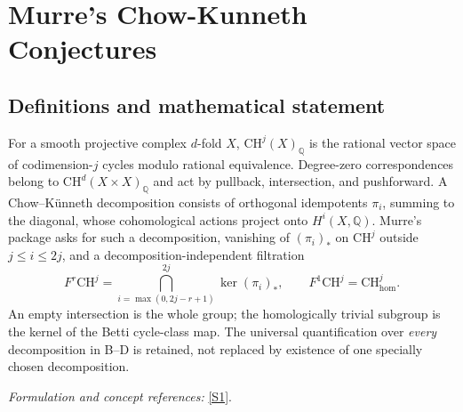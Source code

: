 \documentclass[11pt]{article}
\newcommand{\Q}{\mathbb{Q}}
\newcommand{\sref}[2]{\hyperlink{source:#1:#2}{[S#2]}}
\newif\ifshowcatalogue
\newcommand{\cataloguescope}[1]{\ifshowcatalogue
 \paragraph{Exact scope in the supplied catalogue.}
 \begin{quote}\small #1\end{quote}\fi}
\begin{document}
\setcounter{section}{0}
\clearpage
\section*{\texorpdfstring{Murre's Chow-Kunneth Conjectures}{Murre's Chow-Kunneth Conjectures}}\label{30006755}
\subsection{Definitions and mathematical statement}
For a smooth projective complex $d$-fold $X$, $\mathrm{CH}^j(X)_{\Q}$ is the rational vector space of codimension-$j$ cycles modulo rational equivalence. Degree-zero correspondences belong to $\mathrm{CH}^d(X\times X)_{\Q}$ and act by pullback, intersection, and pushforward. A Chow--K\"unneth decomposition consists of orthogonal idempotents $\pi_i$, summing to the diagonal, whose cohomological actions project onto $H^i(X,\Q)$. Murre's package asks for such a decomposition, vanishing of $(\pi_i)_*$ on $\mathrm{CH}^j$ outside $j\le i\le2j$, and a decomposition-independent filtration
\[
 F^r\mathrm{CH}^j=\bigcap_{i=\max(0,2j-r+1)}^{2j}\ker(\pi_i)_*,
 \qquad F^1\mathrm{CH}^j=\mathrm{CH}^j_{\mathrm{hom}}.
\]
An empty intersection is the whole group; the homologically trivial subgroup is the kernel of the Betti cycle-class map. The universal quantification over \emph{every} decomposition in B--D is retained, not replaced by existence of one specially chosen decomposition.
\par\smallskip\textit{Formulation and concept references:} \sref{30006755}{1}.
\cataloguescope{For every smooth projective irreducible complex variety X of dimension d, let CH\textasciicircum{}j(X)\_Q denote cycles modulo rational equivalence, with Betti Q-cohomology. A correspondence pi in CH\textasciicircum{}d(X x X)\_Q acts by pi\_*(a)=(p\_2)\_*(p\_1\textasciicircum{}*(a).pi). Murre's full A-D package asserts: (A) there exists a Chow-Kunneth decomposition, namely mutually orthogonal composition-idempotents pi\_0,...,pi\_(2d) in CH\textasciicircum{}d(X x X)\_Q summing to the diagonal and inducing projection onto H\textasciicircum{}i(X,Q) for pi\_i; (B) for EVERY such decomposition and 0<=j<=d, pi\_i acts as zero on CH\textasciicircum{}j when i<j or i>2j; (C) for EVERY such decomposition define F\textasciicircum{}r CH\textasciicircum{}j as the intersection of ker(pi\_i)\_* for max(0,2j-r+1)<=i<=2j, r>=0, with empty intersection F\textasciicircum{}0=CH\textasciicircum{}j; these filtrations are equal for ALL decompositions satisfying A; (D) for EVERY such decomposition, F\textasciicircum{}1 CH\textasciicircum{}j equals ker(CH\textasciicircum{}j(X)\_Q -> H\textasciicircum{}(2j)(X,Q)). Under A and B, F\textasciicircum{}(j+1)=0. No multiplicative or self-dual decomposition, explicit construction algorithm, functorial-extra requirement, or arbitrary-base-field enlargement is included.}
\end{document}
